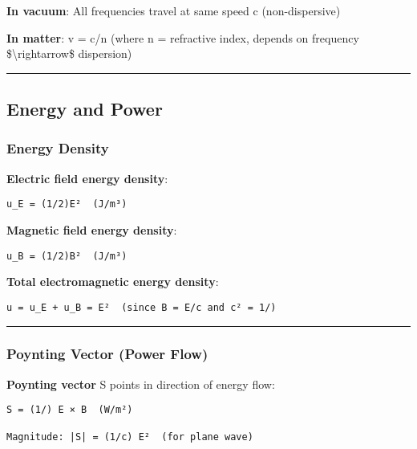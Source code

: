\textbf{In vacuum}: All frequencies travel at same speed c
(non-dispersive)

\textbf{In matter}: v = c/n (where n = refractive index, depends on
frequency \$\textbackslash rightarrow\$ dispersion)

\begin{center}\rule{0.5\linewidth}{0.5pt}\end{center}

\subsection{\texorpdfstring{ Energy and
Power}{ Energy and Power}}\label{energy-and-power}

\subsubsection{Energy Density}\label{energy-density}

\textbf{Electric field energy density}:

\begin{verbatim}
u_E = (1/2)E²  (J/m³)
\end{verbatim}

\textbf{Magnetic field energy density}:

\begin{verbatim}
u_B = (1/2)B²  (J/m³)
\end{verbatim}

\textbf{Total electromagnetic energy density}:

\begin{verbatim}
u = u_E + u_B = E²  (since B = E/c and c² = 1/)
\end{verbatim}

\begin{center}\rule{0.5\linewidth}{0.5pt}\end{center}

\subsubsection{Poynting Vector (Power
Flow)}\label{poynting-vector-power-flow}

\textbf{Poynting vector} S points in direction of energy flow:

\begin{verbatim}
S = (1/) E × B  (W/m²)

Magnitude: |S| = (1/c) E²  (for plane wave)
\end{verbatim}


